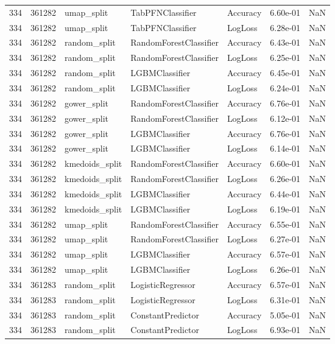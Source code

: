 \begin{tabular}{rrlllrr}
334 & 361282 & umap\_split & TabPFNClassifier & Accuracy & 6.60e-01 & NaN \\
334 & 361282 & umap\_split & TabPFNClassifier & LogLoss & 6.28e-01 & NaN \\
334 & 361282 & random\_split & RandomForestClassifier & Accuracy & 6.43e-01 & NaN \\
334 & 361282 & random\_split & RandomForestClassifier & LogLoss & 6.25e-01 & NaN \\
334 & 361282 & random\_split & LGBMClassifier & Accuracy & 6.45e-01 & NaN \\
334 & 361282 & random\_split & LGBMClassifier & LogLoss & 6.24e-01 & NaN \\
334 & 361282 & gower\_split & RandomForestClassifier & Accuracy & 6.76e-01 & NaN \\
334 & 361282 & gower\_split & RandomForestClassifier & LogLoss & 6.12e-01 & NaN \\
334 & 361282 & gower\_split & LGBMClassifier & Accuracy & 6.76e-01 & NaN \\
334 & 361282 & gower\_split & LGBMClassifier & LogLoss & 6.14e-01 & NaN \\
334 & 361282 & kmedoids\_split & RandomForestClassifier & Accuracy & 6.60e-01 & NaN \\
334 & 361282 & kmedoids\_split & RandomForestClassifier & LogLoss & 6.26e-01 & NaN \\
334 & 361282 & kmedoids\_split & LGBMClassifier & Accuracy & 6.44e-01 & NaN \\
334 & 361282 & kmedoids\_split & LGBMClassifier & LogLoss & 6.19e-01 & NaN \\
334 & 361282 & umap\_split & RandomForestClassifier & Accuracy & 6.55e-01 & NaN \\
334 & 361282 & umap\_split & RandomForestClassifier & LogLoss & 6.27e-01 & NaN \\
334 & 361282 & umap\_split & LGBMClassifier & Accuracy & 6.57e-01 & NaN \\
334 & 361282 & umap\_split & LGBMClassifier & LogLoss & 6.26e-01 & NaN \\
334 & 361283 & random\_split & LogisticRegressor & Accuracy & 6.57e-01 & NaN \\
334 & 361283 & random\_split & LogisticRegressor & LogLoss & 6.31e-01 & NaN \\
334 & 361283 & random\_split & ConstantPredictor & Accuracy & 5.05e-01 & NaN \\
334 & 361283 & random\_split & ConstantPredictor & LogLoss & 6.93e-01 & NaN \\

\end{tabular}
